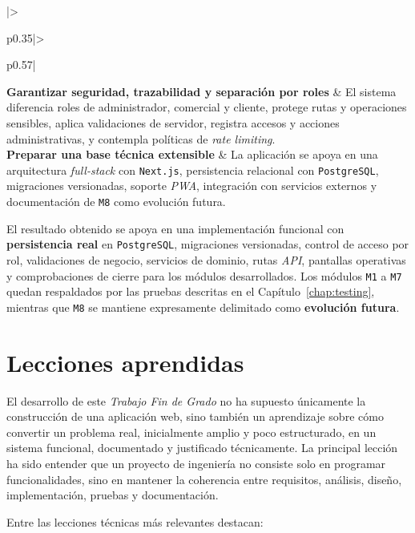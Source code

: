 {\begin{supertabular}{|>{\raggedright\arraybackslash}p{0.35\linewidth}|>{\raggedright\arraybackslash}p{0.57\linewidth}|}
\hline
\textbf{Garantizar seguridad, trazabilidad y separación por roles} & El sistema diferencia roles de administrador, comercial y cliente, protege rutas y operaciones sensibles, aplica validaciones de servidor, registra accesos y acciones administrativas, y contempla políticas de \textit{rate limiting}.\\
\hline
\textbf{Preparar una base técnica extensible} & La aplicación se apoya en una arquitectura \textit{full-stack} con \texttt{Next.js}, persistencia relacional con \texttt{PostgreSQL}, migraciones versionadas, soporte \textit{PWA}, integración con servicios externos y documentación de \texttt{M8} como evolución futura.\\
\hline
\end{supertabular}
}
\renewcommand{\arraystretch}{1}

El resultado obtenido se apoya en una implementación funcional con \textbf{persistencia real} en \texttt{PostgreSQL}, migraciones versionadas, control de acceso por rol, validaciones de negocio, servicios de dominio, rutas \textit{API}, pantallas operativas y comprobaciones de cierre para los módulos desarrollados. Los módulos \texttt{M1} a \texttt{M7} quedan respaldados por las pruebas descritas en el Capítulo~\ref{chap:testing}, mientras que \texttt{M8} se mantiene expresamente delimitado como \textbf{evolución futura}.

\section{Lecciones aprendidas}

El desarrollo de este \textit{Trabajo Fin de Grado} no ha supuesto únicamente la construcción de una aplicación web, sino también un aprendizaje sobre cómo convertir un problema real, inicialmente amplio y poco estructurado, en un sistema funcional, documentado y justificado técnicamente. La principal lección ha sido entender que un proyecto de ingeniería no consiste solo en programar funcionalidades, sino en mantener la coherencia entre requisitos, análisis, diseño, implementación, pruebas y documentación.

Entre las lecciones técnicas más relevantes destacan:

